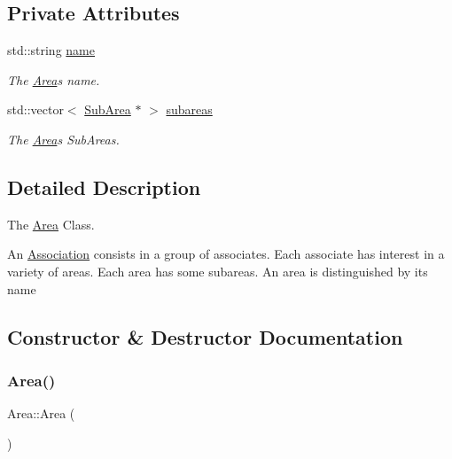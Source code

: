 \subsection*{Private Attributes}
\begin{DoxyCompactItemize}
\item 
std\+::string \mbox{\hyperlink{classArea_a24201719de9d9dfef7a720c036529dd7}{name}}
\begin{DoxyCompactList}\small\item\em The \mbox{\hyperlink{classArea}{Area}}\textquotesingle{}s name. \end{DoxyCompactList}\item 
std\+::vector$<$ \mbox{\hyperlink{classSubArea}{Sub\+Area}} $\ast$ $>$ \mbox{\hyperlink{classArea_af5eafd40b41ae847a009feef631ce07f}{subareas}}
\begin{DoxyCompactList}\small\item\em The \mbox{\hyperlink{classArea}{Area}}\textquotesingle{}s Sub\+Areas. \end{DoxyCompactList}\end{DoxyCompactItemize}


\subsection{Detailed Description}
The \mbox{\hyperlink{classArea}{Area}} Class. 

An \mbox{\hyperlink{classAssociation}{Association}} consists in a group of associates. Each associate has interest in a variety of areas. Each area has some subareas. An area is distinguished by its name 

\subsection{Constructor \& Destructor Documentation}
\mbox{\label{classArea_aa92851fcffb0a9f1c6c8c283204f7003}} 
\subsubsection{\texorpdfstring{Area()}{Area()}\hspace{0.1cm}{\footnotesize\ttfamily [1/2]}}
{\footnotesize\ttfamily Area\+::\+Area (\begin{DoxyParamCaption}{ }\end{DoxyParamCaption})}



